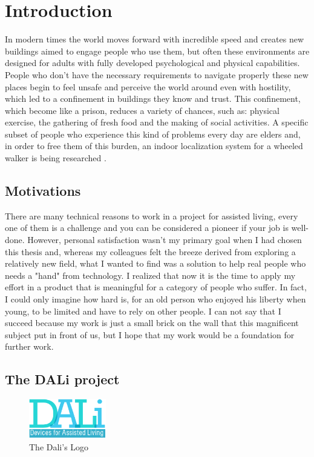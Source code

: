 \chapter{Introduction}
In modern times the world moves forward with incredible speed and creates new buildings aimed to engage people who use them, but often these environments are designed for adults with fully developed psychological and physical capabilities.
People who don't have the necessary requirements to navigate properly these new places begin to feel unsafe and perceive the world around even with hostility, which led to a confinement in buildings they know and trust.
This confinement, which become like a prison, reduces a variety of chances, such as: physical exercise, the gathering of fresh food and the making of social activities.
A specific subset of people who experience this kind of problems every day are elders and, in order to free them of this burden, an indoor localization system for a wheeled walker is being researched . 

\section{Motivations}

There are many technical reasons to work in a project for assisted living, every one of them is a challenge and you can be considered a pioneer if your job is well-done.
However, personal satisfaction wasn't my primary goal when I had chosen this thesis and, whereas my colleagues felt the breeze derived from exploring a relatively new field, what I wanted to find was a solution to help real people who needs a "hand" from technology.
I realized that now it is the time to apply my effort in a product that is meaningful for a category of people who suffer. 
In fact, I could only imagine how hard is, for an old person who enjoyed his liberty when young, to be limited and have to rely on other people.
I can not say that I succeed because my work is just a small brick on the wall that this magnificent subject put in front of us, but I hope that my work would be a foundation for further work.

\section{The DALi project}

\vspace{1cm}
\begin{figure}[hbt]
	  \centering
      \includegraphics[width=0.3\textwidth]{img/Dali-logo.png}
      \caption{The Dali's Logo}
\end{figure}
\vspace{1cm}

